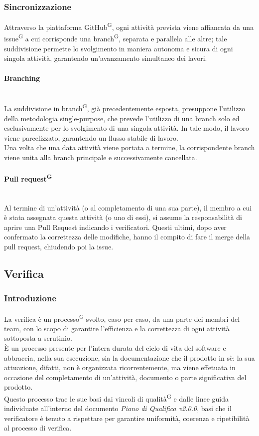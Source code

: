 \documentclass[8pt]{article}
\newcommand{\glossterm}[1]{#1\textsuperscript{G}} %
\newcommand{\subsubsubsection}[1]{\paragraph{#1}\mbox{}\\}
\begin{document}
\subsubsection{Sincronizzazione}
Attraverso la piattaforma \glossterm{GitHub}, ogni attività prevista viene affiancata da una \glossterm{issue} a
cui corrisponde una \glossterm{branch}, separata e parallela alle altre; tale suddivisione permette lo svolgimento in maniera autonoma e sicura di ogni singola attività, garantendo un'avanzamento simultaneo dei lavori.

\subsubsubsection{Branching}
La suddivisione in \glossterm{branch}, già precedentemente esposta, presuppone l'utilizzo della metodologia single-purpose, che prevede l'utilizzo di una branch solo ed esclusivamente per lo svolgimento di una singola attività. In tale modo, il lavoro viene parcelizzato, garantendo un flusso stabile di lavoro. \\
Una volta che una data attività viene portata a termine, la corrispondente branch viene unita alla branch principale e successivamente cancellata.

\subsubsubsection{\glossterm{Pull request}}
Al termine di un'attività (o al completamento di una sua parte), il membro a cui è stata assegnata questa attività (o uno di essi), si assume la responsabilità di aprire una Pull Request indicando i verificatori. Questi ultimi, dopo aver confermato la correttezza delle modifiche, hanno il compito di fare il merge della pull request, chiudendo poi la issue.

\subsection{Verifica} \label{sec:verifica}

\subsubsection{Introduzione}
La verifica è un \glossterm{processo} svolto, caso per caso, da una parte dei membri del team, con lo scopo di garantire l'efficienza e la correttezza di ogni attività sottoposta a scrutinio. \\
È un processo presente per l'intera durata del ciclo di vita del software e abbraccia, nella sua esecuzione, sia la documentazione che il prodotto in sè: la sua attuazione, difatti, non è organizzata ricorrentemente, ma viene effetuata in occasione del completamento di un'attività, documento o parte significativa del prodotto. \\
Questo processo trae le sue basi dai vincoli di \glossterm{qualità} e dalle linee guida individuate all'interno
del documento \textit{Piano di Qualifica v2.0.0}, basi che il verificatore è tenuto a rispettare per garantire uniformità, coerenza e ripetibilità al processo di verifica.
\end{document}
